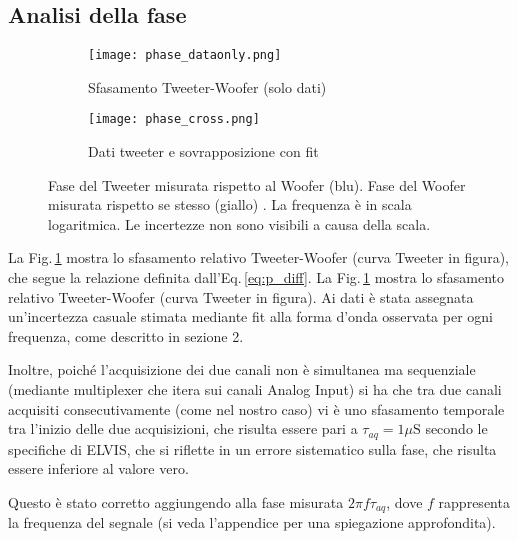 \documentclass[../Relazione_circuiti]{subfiles}
\begin{document}
\subsection{Analisi della fase}

  \begin{figure}[H]
    \centering

    \begin{subfigure}{=0.49\textwidth}
      \centering
      \texttt{[image: phase\_dataonly.png]}
      \caption{Sfasamento Tweeter-Woofer (solo dati)}
      \label{fig: pdiff_dataonly}

    \end{subfigure}
    \hfill
    \begin{subfigure}{=0.49\textwidth}
      \centering
      \texttt{[image: phase\_cross.png]}
      \caption{Dati tweeter e sovrapposizione con fit}
      \label{fig: pdiff_fit_data}

    \end{subfigure}

    \caption{Fase del Tweeter misurata rispetto al Woofer (blu). Fase del Woofer misurata rispetto se stesso (giallo)
      . La frequenza è in scala logaritmica. Le incertezze non sono visibili a causa della scala.}
    \label{fig: phase_diff}

  \end{figure}

  La Fig.\,\ref{fig: pdiff_dataonly} mostra lo sfasamento relativo Tweeter-Woofer (curva Tweeter in figura), che segue la
  relazione definita dall'Eq.\,\eqref{eq:p_diff}.
  La Fig.\,\ref{fig: pdiff_dataonly} mostra lo sfasamento relativo Tweeter-Woofer (curva Tweeter in figura).
  Ai dati è stata assegnata un'incertezza casuale stimata mediante fit alla forma d'onda osservata per ogni frequenza,
  come descritto in sezione 2.  
  
Inoltre, poiché l'acquisizione dei due canali non è simultanea ma sequenziale (mediante multiplexer che itera sui
  canali Analog Input) si ha che tra due canali acquisiti consecutivamente (come nel nostro caso) vi è uno sfasamento
  temporale tra l'inizio delle due acquisizioni, che risulta essere pari a $\tau_{aq}=1 \mu \mathrm{S}$
      secondo le specifiche di ELVIS, che si riflette in un errore sistematico sulla fase, che risulta essere inferiore
      al valore vero.

      Questo è stato corretto aggiungendo alla fase misurata  $ 2 \pi f \tau_{aq}$, dove $f$
      rappresenta la frequenza del segnale (si veda l'appendice per una spiegazione approfondita).
\end{document}
